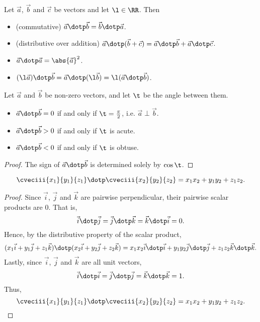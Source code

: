 \begin{fact}
    Let $\vec a$, $\vec b$ and $\vec c$ be vectors and let $\l \in \RR$. Then
    \begin{itemize}
        \item (commutative) $\vec a \dotp \vec b = \vec b \dotp \vec a$.
        \item (distributive over addition) $\vec a \dotp (\vec b + \vec c) = \vec a \dotp \vec b + \vec a \dotp \vec c$.
        \item $\vec a \dotp \vec a = \abs{\vec a}^2$.
        \item $(\l \vec a) \dotp \vec b = \vec a \dotp (\l \vec b) = \l (\vec a \dotp \vec b)$.
    \end{itemize}
\end{fact}

\begin{proposition}
    Let $\vec a$ and $\vec b$ be non-zero vectors, and let $\t$ be the angle between them.
    \begin{itemize}
        \item $\vec a \dotp \vec b = 0$ if and only if $\t = \frac\pi2$, i.e. $\vec a \perp \vec b$.
        \item $\vec a \dotp \vec b > 0$ if and only if $\t$ is acute.
        \item $\vec a \dotp \vec b < 0$ if and only if $\t$ is obtuse.
    \end{itemize}
\end{proposition}
\begin{proof}
    The sign of $\vec a \dotp \vec b$ is determined solely by $\cos \t$.
\end{proof}

\begin{proposition}
    \[\cveciii{x_1}{y_1}{z_1} \dotp \cveciii{x_2}{y_2}{z_2} = x_1 x_2 + y_1 y_2 + z_1 z_2.\]
\end{proposition}
\begin{proof}
    Since $\vec i$, $\vec j$ and $\vec k$ are pairwise perpendicular, their pairwise scalar products are 0. That is, \[\vec i \dotp \vec j = \vec j \dotp \vec k = \vec k \dotp \vec i = 0.\] Hence, by the distributive property of the scalar product, \[(x_1 \vec i + y_1 \vec j + z_1 \vec k) \dotp (x_2 \vec i + y_2 \vec j + z_2 \vec k) = x_1 x_2 \vec i \dotp \vec i + y_1 y_2 \vec j \dotp \vec j + z_1 z_2 \vec k \dotp \vec k.\] Lastly, since $\vec i$, $\vec j$ and $\vec k$ are all unit vectors, \[\vec i \dotp \vec i = \vec j \dotp \vec j = \vec k \dotp \vec k = 1.\] Thus, \[\cveciii{x_1}{y_1}{z_1} \dotp \cveciii{x_2}{y_2}{z_2} = x_1 x_2 + y_1 y_2 + z_1 z_2.\]
\end{proof}

